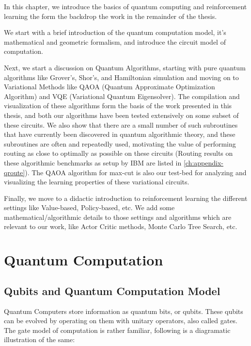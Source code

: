 In this chapter, we introduce the basics of quantum computing and reinforcement learning the form the backdrop the work in the remainder of the thesis.

We start with a brief introduction of the quantum computation model, it's mathematical and geometric formalism, and introduce the circuit model of computation. 

Next, we start a discussion on Quantum Algorithms, starting with pure quantum algorithms like Grover's, Shor's, and Hamiltonian simulation and moving on to Variational Methods like QAOA (Quantum Approximate Optimization Algorithm) and VQE (Variational Quantum Eigensolver). The compilation and visualization of these algorithms form the basis of the work presented in this thesis, and both our algorithms have been tested extensively on some subset of these circuits. We also show that there are a small number of such subroutines that have currently been discovered in quantum algorithmic theory, and these subroutines are often and repeatedly used, motivating the value of performing routing as close to optimally as possible on these circuits (Routing results on these algorithmic benchmarks as setup by IBM are listed in \ref{ch:appendix-qroute}). The QAOA algorithm for max-cut is also our test-bed for analyzing and visualizing the learning properties of these variational circuits.

Finally, we move to a didactic introduction to reinforcement learning the different settings like Value-based, Policy-based, etc. We add some mathematical/algorithmic details to those settings and algorithms which are relevant to our work, like Actor Critic methods, Monte Carlo Tree Search, etc.

\section{Quantum Computation}


\subsection{Qubits and Quantum Computation Model}

Quantum Computers store information as quantum bits, or qubits. These qubits can be evolved by operating on them with unitary operators, also called gates. The gate model of computation is rather familiar, following is a diagramatic illustration of the same:

